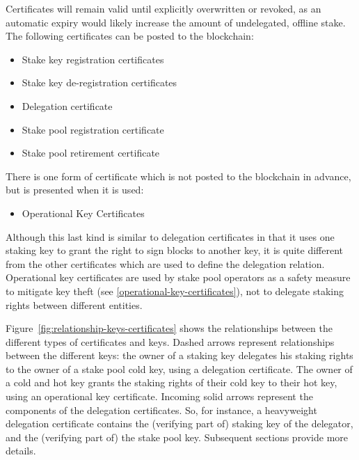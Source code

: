 \documentclass[11pt,a4paper]{article}
\begin{document}
Certificates will remain valid
until explicitly overwritten or revoked, as an automatic expiry would
likely increase the amount of undelegated, offline stake. The following
certificates can be posted to the blockchain:
\begin{itemize}
\item Stake key registration certificates
\item Stake key de-registration certificates
\item Delegation certificate
\item Stake pool registration certificate
\item Stake pool retirement certificate
\end{itemize}
There is one form of certificate which is not posted to the blockchain
in advance, but is presented when it is used:
\begin{itemize}
\item
  Operational Key Certificates
\end{itemize}
Although this last kind is similar to delegation certificates in that
it uses one staking key to grant the right to sign blocks to another
key, it is quite different from the other certificates which are used
to define the delegation relation. Operational key certificates are
used by stake pool operators as a safety measure to mitigate key
theft (see \cref{operational-key-certificates}), not to delegate
staking rights between different entities.

Figure~\ref{fig:relationship-keys-certificates} shows the relationships between
the different types of certificates and keys.
%
Dashed arrows represent relationships between the different keys: the owner of
a staking key delegates his staking rights to the owner of a stake pool cold
key, using a delegation certificate.
%
The owner of a cold and hot key grants the staking rights of their cold key to their
hot key, using an operational key certificate.
%
Incoming solid arrows represent the components of the delegation certificates.
So, for instance, a heavyweight delegation certificate contains the (verifying
part of) staking key of the delegator, and the (verifying part of) the stake
pool key.
%
Subsequent sections provide more details.
\end{document}
